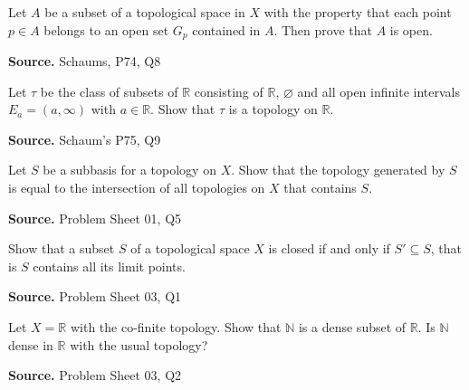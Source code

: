 \documentclass[12pt,twoside]{report}
\newenvironment*{source}{\hfill\scriptsize\textbf{Source.}\space}{\par}
\begin{document}
\begin{samepage}
\begin{ex}
Let $A$ be a subset of a topological space in $X$ with the property that each point $p \in A$ belongs to an open set $G_p$ contained in $A$. 
Then prove that $A$ is open.
\end{ex}
\begin{source}
Schaums, P74, Q8
\end{source}
\end{samepage}

\begin{samepage}
\begin{ex}
Let $\tau$ be the class of subsets of $\mathbb{R}$ consisting of $\mathbb{R}$, $\varnothing$ and all open infinite intervals $E_a = \left (a, \infty\right )$ with $a \in \mathbb{R}$.
Show that $\tau$ is a topology on $\mathbb{R}$.
\end{ex}
\begin{source}
Schaum's P75, Q9
\end{source}
\end{samepage}

\begin{samepage}
\begin{ex}
Let $S$ be a subbasis for a topology on $X$. Show that the topology generated by $S$ is equal to the intersection of all topologies on $X$ that contains $S$.
\end{ex}
\begin{source}
Problem Sheet 01, Q5
\end{source}
\end{samepage}

\begin{samepage}
\begin{ex}
Show that a subset $S$ of a topological space $X$ is closed if and only if $S' \subseteq S$, that is $S$ contains all its limit points.
\end{ex}
\begin{source}
Problem Sheet 03, Q1
\end{source}
\end{samepage}

\begin{samepage}
\begin{ex}
Let $X = \mathbb{R}$ with the co-finite topology. Show that $\mathbb{N}$ is a dense subset of $\mathbb{R}$. Is $\mathbb{N}$ dense in $\mathbb{R}$ with the usual topology?
\end{ex}
\begin{source}
Problem Sheet 03, Q2
\end{source}
\end{samepage}
\end{document}

